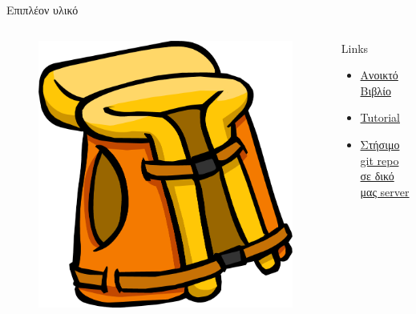 \documentclass{beamer}
\begin{document}
\begin{frame}{Επιπλέον υλικό}
\begin{columns}
    \begin{figure}
      \includegraphics[scale=0.1]{lifejacket.png} 
    \end{figure}
    \begin{block}{Links}
      \begin{itemize}
	\item  \href{http://git-scm.com/book}{Ανοικτό Βιβλίο}
	\item \href{http://try.github.io/levels/1/challenges/1}{Tutorial}
	\item \href{http://git-scm.com/book/ch4-2.html}{Στήσιμο git repo σε δικό μας server}
      \end{itemize}
    \end{block}
\end{columns}
\end{frame}
\end{document}
